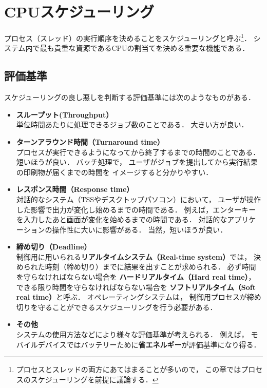 \chapter{CPUスケジューリング}
プロセス（スレッド）の実行順序を決めることをスケジューリングと呼ぶ\footnote{
プロセスとスレッドの両方にあてはまることが多いので，
この章ではプロセスのスケジューリングを前提に議論する．}．
システム内で最も貴重な資源であるCPUの割当てを決める重要な機能である．

\section{評価基準}
スケジューリングの良し悪しを判断する評価基準には次のようなものがある．

\begin{itemize}
\item {\bf スループット(Throughput）} \\
単位時間あたりに処理できるジョブ数のことである．
大きい方が良い．

\item {\bf ターンアラウンド時間（Turnaround time）} \\
プロセスが実行できるようになってから終了するまでの時間のことである．
短いほうが良い．
バッチ処理で，
ユーザがジョブを提出してから実行結果の印刷物が届くまでの時間を
イメージすると分かりやすい．

\item {\bf レスポンス時間（Response time）} \\
対話的なシステム（TSSやデスクトップパソコン）において，
ユーザが操作した影響で出力が変化し始めるまでの時間である．
例えば，エンターキーを入力したあと画面が変化を始めるまでの時間である．
対話的なアプリケーションの操作性に大いに影響がある．
当然，短いほうが良い．

\item {\bf 締め切り（Deadline）} \\
制御用に用いられる{\bf リアルタイムシステム（Real-time system）}では，
決められた時刻（締め切り）までに結果を出すことが求められる．
必ず時間を守らなければならない場合を
{\bf ハードリアルタイム（Hard real time）}，
できる限り時間を守らなければならない場合を
{\bf ソフトリアルタイム（Soft real time）}と呼ぶ．
オペレーティングシステムは，
制御用プロセスが締め切りを守ることができるスケジューリングを行う必要がある．

\item {\bf その他} \\
システムの使用方法などにより様々な評価基準が考えられる．
例えば，
モバイルデバイスではバッテリーために{\bf 省エネルギー}が評価基準になり得る．
\end{itemize}

